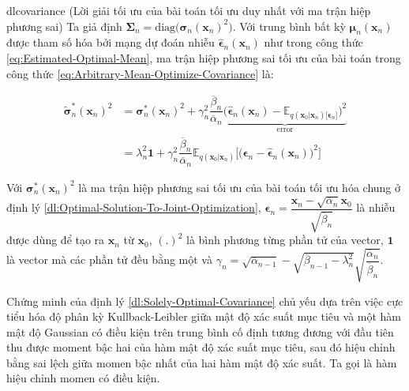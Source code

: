 \documentclass[14pt, a4paper]{article}
\numberwithin{equation}{section}
\numberwithin{figure}{section}
\numberwithin{dl}{section}
\numberwithin{md}{section}
\numberwithin{bd}{section}
\numberwithin{dn}{section}
\numberwithin{hq}{section}
\begin{document}
    \begin{restatable}{dl}{covariance} \label{dl:Solely-Optimal-Covariance}
        (Lời giải tối ưu của bài toán tối ưu duy nhất với ma trận hiệp phương sai)
        Ta giả định $\boldsymbol{\Sigma}_n = \mathrm{diag} \big( \boldsymbol{\sigma}_n (\boldsymbol{x}_n)^2 \big)$.
        Với trung bình bất kỳ $\boldsymbol{\mu}_n (\boldsymbol{x}_n)$ được tham số hóa bởi mạng dự đoán nhiễu $\hat{\boldsymbol{\epsilon}}_n (\boldsymbol{x}_n)$ như trong công thức \ref{eq:Estimated-Optimal-Mean},
        ma trận hiệp phương sai tối ưu của bài toán trong công thức \ref{eq:Arbitrary-Mean-Optimize-Covariance} là:

        \begin{equation} \label{eq:Corrected-Optimal-Covariance}
            \begin{aligned}
                \tilde{\boldsymbol{\sigma}}_n^{\ast} (\boldsymbol{x}_n)^2 &= \boldsymbol{\sigma}_n^{\ast} (\boldsymbol{x}_n)^2 + \gamma_n^2 \dfrac{\overline{\beta}_n}{\overline{\alpha}_n} \underbrace{\big( \hat{\boldsymbol{\epsilon}}_n (\boldsymbol{x}_n) - \mathbb{E}_{q(\boldsymbol{x}_0 \vert \boldsymbol{x}_n) \lbrack \boldsymbol{\epsilon}_n \rbrack} \big)^2}_{\mathrm{error}} \\
                &= \lambda_n^2 \boldsymbol{1} + \gamma_n^2 \dfrac{\overline{\beta}_n}{\overline{\alpha}_n} \mathbb{E}_{q(\boldsymbol{x}_0 \vert \boldsymbol{x}_n)} \Big\lbrack \big( \boldsymbol{\epsilon}_n - \hat{\boldsymbol{\epsilon}}_n (\boldsymbol{x}_n) \big)^2 \Big\rbrack
            \end{aligned}
        \end{equation}

        Với $\boldsymbol{\sigma}_n^{\ast} (\boldsymbol{x}_n)^2$ là ma trận hiệp phương sai tối ưu của bài toán tối ưu hóa chung ở định lý \ref{dl:Optimal-Solution-To-Joint-Optimization},
        $\boldsymbol{\epsilon}_n = \dfrac{\boldsymbol{x}_n - \sqrt{\overline{\alpha}_n} \boldsymbol{x}_0}{\sqrt{\overline{\beta}_n}}$ là nhiễu được dùng để tạo ra $\boldsymbol{x}_n$ từ $\boldsymbol{x}_0$,
        $(.)^2$ là bình phương từng phần tử của vector, $\boldsymbol{1}$ là vector mà các phần tử đều bằng một và $\gamma_n = \sqrt{\overline{\alpha}_{n-1}} - \sqrt{\overline{\beta}_{n-1} - \lambda_n^2} \sqrt{\dfrac{\overline{\alpha}_n}{\overline{\beta}_n}}$.
    \end{restatable}

    Chứng minh của định lý \ref{dl:Solely-Optimal-Covariance} chủ yếu dựa trên việc cực tiểu hóa độ phân kỳ Kullback-Leibler giữa mật độ xác suất mục tiêu và một hàm mật độ Gaussian có điều kiện trên trung bình cố định tương đương với đầu tiên thu được moment bậc hai của hàm mật độ xác suất mục tiêu,
    sau đó hiệu chỉnh bằng sai lệch giữa momen bậc nhất của hai hàm mật độ xác suất.
    Ta gọi là hàm hiệu chỉnh momen có điều kiện.
\end{document}
